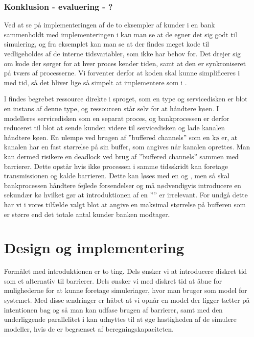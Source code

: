 \subsubsection{Konklusion - evaluering - ?}
Ved at se på  implementeringen af de to eksempler af kunder i en bank sammenholdt med implementeringen i \simpy kan man se at de egner det sig godt til 
simulering, og fra eksemplet kan man se at der findes meget kode til 
vedligeholdes af de interne tidsvariabler, som \simpy ikke har behov for. Det drejer sig 
om kode der sørger for at hver proces kender tiden, samt at den er 
synkroniseret på tværs af processerne. Vi forventer derfor at koden skal kunne 
simplificeres i \pycsp med tid, så det bliver lige så simpelt at implementere som i 
\simpy. 

I \simpy findes begrebet ressource direkte i sproget, som en type og 
servicedisken er blot en instans af denne type, og ressourcen står selv for at 
håndtere køen. I \pycsp modelleres servicedisken som en separat proces, og 
bankprocessen er derfor reduceret til blot at sende kunden videre til 
servicedisken og lade kanalen håndtere køen. En ulempe ved brugen af ''buffered 
channels'' som en kø er, at kanalen har en fast størrelse på sin buffer, som 
angives når kanalen oprettes. Man kan dermed risikere en deadlock ved brug af ''buffered 
channels'' sammen med barrierer. Dette opstår hvis ikke processen i samme 
tidsskridt kan foretage transmissionen og kalde barrieren.
Dette kan løses med en  og , men så 
skal bankprocessen håndtere fejlede forsendelser og må nødvendigvis introducere en 
sekundær kø hvilket gør at introduktionen af en '''' er 
irrelevant. For undgå dette har vi i vores tilfælde valgt blot at 
angive en maksimal størrelse på bufferen som er større end det totale antal 
kunder banken modtager.

\section{Design og implementering}
Formålet med introduktionen er to ting. Dels ønsker vi at introducere diskret tid som et alternativ til barrierer. Dels ønsker vi med diskret tid at åbne for mulighederne for at kunne foretage simuleringer, hvor man bruger \csp som model for systemet. Med disse ændringer er håbet at vi opnår en model der ligger tætter på intentionen bag \csp og så man kan udfase brugen af barrierer, samt med den underliggende parallelitet i \csp kan udnyttes til at øge hastigheden af de simulere modeller, hvis de er begrænset af beregningskapaciteten.
    
